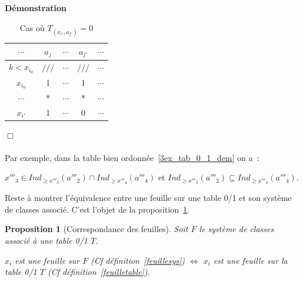 \documentclass[a4paper]{report}
\renewcommand{\textbf}[1]{\begingroup\bfseries\mathversion{bold}#1\endgroup}
\newtheorem{proposition}{Proposition}[chapter]
\newenvironment{preuve}{\textbf{Démonstration}}{}
\begin{document}
\begin{preuve}
\begin{table}[htb]
 \begin{tabular}{*{4}{c|} c}
   $\cdots$ & $a_j$ & $\cdots$ & $a_{j'}$ & $\cdots$\\
 \hline   
   $k<x_{i_0}$ & $///$ & $\cdots$ & $///$ & $\cdots$\\
 \hline
   $x_{i_0}$ & 1 & $\cdots$ & 1 & $\cdots$\\
 \hline
   $\cdots$ & * & $\cdots$ & * & $\cdots$\\
 \hline
   $x_{i'}$ & 1 & $\cdots$ & 0 & $\cdots$
 \end{tabular}
\caption{Cas où  $T_{(x_{i'}, a_{j'})} = 0$ }
\end{table}

$\Box$
\end{preuve}

\paragraph{}Par exemple, dans la table bien ordonnée~\ref{3ex_tab_0_1_dem} on a~:

$x'''_3\in Ind_{\geqslant x'''_3}(a'''_2) \cap Ind_{\geqslant x'''_4}(a'''_4)$ 
 et $Ind_{\geqslant x'''_3}(a'''_2) \subseteq Ind_{\geqslant x'''_3}(a'''_4)$.

Reste à montrer l'équivalence entre une feuille sur une table 0/1 et son système de classes associé. C'est l'objet de la proposition~\ref{propfeuille}.

\begin{proposition}[Correspondance des feuilles]
\label{propfeuille}
Soit $F$ le système de classes associé à une table 0/1 $T$.

$x_i$ est une feuille sur $F$ (Cf définition~\ref{feuillesys})
$\Leftrightarrow$
$x_i$ est une feuille sur la table 0/1 $T$ (Cf définition~\ref{feuilletable}).
\end{proposition}
\end{document}
